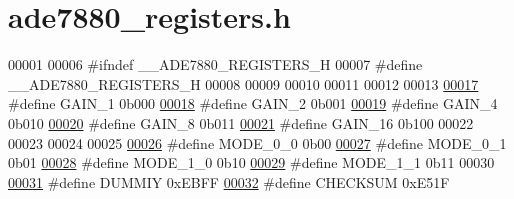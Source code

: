 \hypertarget{a00036}{\section{ade7880\-\_\-registers.\-h}
\label{de/d8c/a00036}
}

\begin{DoxyCode}
00001 
00006 \textcolor{preprocessor}{#ifndef \_\_ADE7880\_REGISTERS\_H }
00007 \textcolor{preprocessor}{}\textcolor{preprocessor}{#define \_\_ADE7880\_REGISTERS\_H }
00008 \textcolor{preprocessor}{}
00009 
00010 
00011 
00012 
00013 
\hypertarget{a00036_source_l00017}{}\hyperlink{a00036_a3c686a06cc9d837e73b259bcc054217e}{00017} \textcolor{preprocessor}{#define GAIN\_1              0b000       }
\hypertarget{a00036_source_l00018}{}\hyperlink{a00036_a7ce9d36acd86736019606c4d928b7aad}{00018} \textcolor{preprocessor}{}\textcolor{preprocessor}{#define GAIN\_2              0b001   }
\hypertarget{a00036_source_l00019}{}\hyperlink{a00036_a8720f417f5b56154123f813b2a011c46}{00019} \textcolor{preprocessor}{}\textcolor{preprocessor}{#define GAIN\_4              0b010 }
\hypertarget{a00036_source_l00020}{}\hyperlink{a00036_a9b90b27f7ed8ebac69dd8b82df741872}{00020} \textcolor{preprocessor}{}\textcolor{preprocessor}{#define GAIN\_8              0b011}
\hypertarget{a00036_source_l00021}{}\hyperlink{a00036_a849e708719d768ea90ada6f58eea52a8}{00021} \textcolor{preprocessor}{}\textcolor{preprocessor}{#define GAIN\_16             0b100}
00022 \textcolor{preprocessor}{}
00023 
00024 
00025 
\hypertarget{a00036_source_l00026}{}\hyperlink{a00036_ab25bd124940aca39914f363b92cabb95}{00026} \textcolor{preprocessor}{#define MODE\_0\_0            0b00       }
\hypertarget{a00036_source_l00027}{}\hyperlink{a00036_aa4b4d2ec825ed4a85181717901110ff7}{00027} \textcolor{preprocessor}{}\textcolor{preprocessor}{#define MODE\_0\_1            0b01   }
\hypertarget{a00036_source_l00028}{}\hyperlink{a00036_a2f363ec07f38ba94cc1d74172233d801}{00028} \textcolor{preprocessor}{}\textcolor{preprocessor}{#define MODE\_1\_0            0b10 }
\hypertarget{a00036_source_l00029}{}\hyperlink{a00036_abfccf6bbc27bb259fc6233bc9ee591e2}{00029} \textcolor{preprocessor}{}\textcolor{preprocessor}{#define MODE\_1\_1            0b11}
00030 \textcolor{preprocessor}{}
\hypertarget{a00036_source_l00031}{}\hyperlink{a00036_aa2594962ecec33d43f5b8dea993068ca}{00031} \textcolor{preprocessor}{#define DUMMIY   0xEBFF    }
\hypertarget{a00036_source_l00032}{}\hyperlink{a00036_a9886586c91a412164c69eb0270d2875e}{00032} \textcolor{preprocessor}{}\textcolor{preprocessor}{#define CHECKSUM 0xE51F }

\end{DoxyCode}

